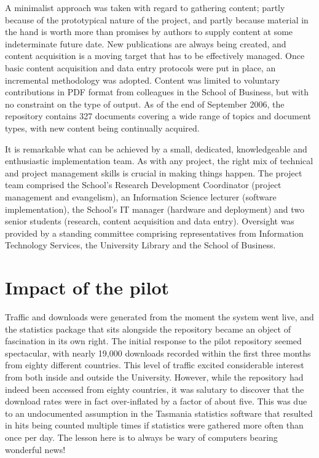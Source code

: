 \documentclass[12pt,pdftex,a4paper,titlepage]{article}
\begin{document}
A minimalist approach was taken with regard to gathering content; partly because of the prototypical nature of the project, and partly because material in the hand is worth more than promises by authors to supply content at some indeterminate future date. New publications are always being created, and content acquisition is a moving target that has to be effectively managed. Once basic content acquisition and data entry protocols were put in place, an incremental methodology was adopted. Content was limited to voluntary contributions in PDF format from colleagues in the School of Business, but with no constraint on the type of output. As of the end of September 2006, the repository contains 327 documents covering a wide range of topics and document types, with new content being continually acquired.

It is remarkable what can be achieved by a small, dedicated, knowledgeable and enthusiastic implementation team. As with any project, the right mix of technical and project management skills is crucial in making things happen. The project team comprised the School's Research Development Coordinator (project management and evangelism), an Information Science lecturer (software implementation), the School's IT manager (hardware and deployment) and two senior students (research, content acquisition and data entry). Oversight was provided by a standing committee comprising representatives from Information Technology Services, the University Library and the School of Business.


\section{Impact of the pilot}

Traffic and downloads were generated from the moment the system went live, and the statistics package that sits alongside the repository became an object of fascination in its own right. The initial response to the pilot repository seemed spectacular, with nearly 19,000 downloads recorded within the first three months from eighty different countries. This level of traffic excited considerable interest from both inside and outside the University. However, while the repository had indeed been accessed from eighty countries, it was salutary to discover that the download rates were in fact over-inflated by a factor of about five. This was due to an undocumented assumption in the Tasmania statistics software \cite{Sale-A-2006-stats} that resulted in hits being counted multiple times if statistics were gathered more often than once per day. The lesson here is to always be wary of computers bearing wonderful news!
\end{document}
